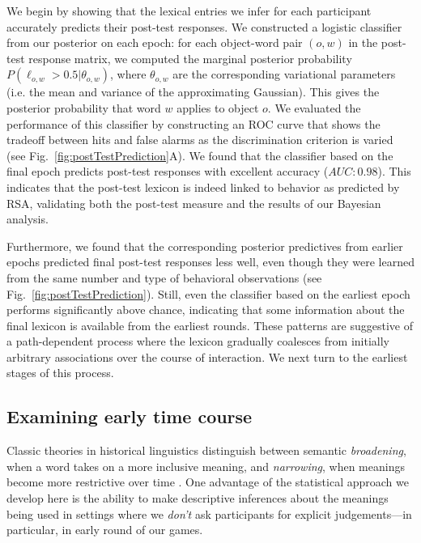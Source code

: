 \documentclass[10pt,letterpaper]{article}
\begin{document}
We begin by showing that the lexical entries we infer for each participant accurately predicts their post-test responses. 
We constructed a logistic classifier from our posterior on each epoch: for each object-word pair $(o,w)$ in the post-test response matrix, we computed the marginal posterior probability $P(\ell_{o,w} > 0.5| \theta_{o,w})$, where $\theta_{o,w}$ are the corresponding variational parameters (i.e. the mean and variance of the approximating Gaussian). This gives the posterior probability that word $w$ applies to object $o$. We evaluated the performance of this classifier by constructing an ROC curve that shows the tradeoff between hits and false alarms as the discrimination criterion is varied (see Fig.\ \ref{fig:postTestPrediction}A). We found that the classifier based on the final epoch predicts post-test responses with excellent accuracy ($AUC: 0.98$). This indicates that the post-test lexicon is indeed linked to behavior as predicted by RSA, validating both the post-test measure and the results of our Bayesian analysis.

Furthermore, we found that the corresponding posterior predictives from earlier epochs predicted final post-test responses less well, even though they were learned from the same number and type of behavioral observations (see Fig.\ \ref{fig:postTestPrediction}). Still, even the classifier based on the earliest epoch performs significantly above chance, indicating that some information about the final lexicon is available from the earliest rounds. These patterns are suggestive of a path-dependent process where the lexicon gradually coalesces from initially arbitrary associations over the course of interaction. We next turn to the earliest stages of this process.%

\subsection{Examining early time course}


Classic theories in historical linguistics distinguish between semantic \emph{broadening}, when a word takes on a more inclusive meaning, and \emph{narrowing}, when meanings become more restrictive over time \cite{TraugottDasher02_RegularitySemanticChange}. One advantage of the statistical approach we develop here is the ability to make descriptive inferences about the meanings being used in settings where we \emph{don't} ask participants for explicit judgements---in particular, in early round of our games. 
\end{document}
